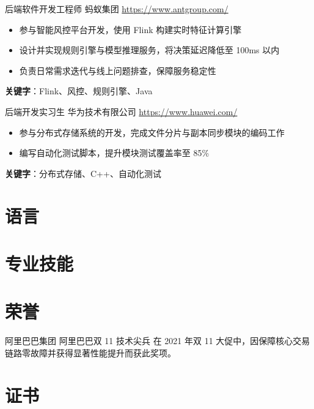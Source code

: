 \documentclass[a4paper, serif, 10pt]{moderncv}
\begin{document}
        {后端软件开发工程师}
        {蚂蚁集团}
        {\url{https://www.antgroup.com/}}
        {}
        {\begin{itemize}
\item 参与智能风控平台开发，使用 Flink 构建实时特征计算引擎
\item 设计并实现规则引擎与模型推理服务，将决策延迟降低至 100ms 以内
\item 负责日常需求迭代与线上问题排查，保障服务稳定性
\end{itemize}
\textbf{关键字}：Flink、风控、规则引擎、Java}

        {后端开发实习生}
        {华为技术有限公司}
        {\url{https://www.huawei.com/}}
        {}
        {\begin{itemize}
\item 参与分布式存储系统的开发，完成文件分片与副本同步模块的编码工作
\item 编写自动化测试脚本，提升模块测试覆盖率至 85\%
\end{itemize}
\textbf{关键字}：分布式存储、C++、自动化测试}
\section{语言}

\section{专业技能}

\section{荣誉}

        {阿里巴巴集团}
        {阿里巴巴双 11 技术尖兵}
        {}
        {}
        {在 2021 年双 11 大促中，因保障核心交易链路零故障并获得显著性能提升而获此奖项。}
\section{证书}
\end{document}
